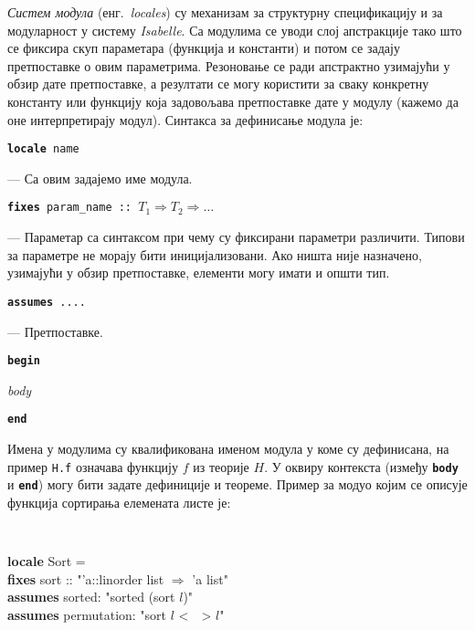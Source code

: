 {\em Систем модула} (енг.~\emph{locales}) \cite{locales} су механизам
за структурну спе\-ци\-фи\-ка\-ци\-ју и за модуларност у систему
\emph{Isabelle}. Са модулима се уводи слој апстракције тако што се
фиксира скуп параметара (функција и константи) и потом се задају
претпоставке о овим параметрима. Ре\-зо\-но\-ва\-ње се ради
апстрактно узимајући у обзир дате претпоставке, а ре\-зу\-лта\-ти се
могу користити за сваку конкретну константу или функцију која
задовољава претпоставке дате у мо\-ду\-лу (кажемо да оне
интерпретирају модул). Синтакса за дефинисање модула је:

\smallskip

{\tt \textbf{locale} name}

--- Са овим задајемо име модула. 

\vspace{0.15cm}

\hspace{0.5cm} {\tt \textbf{fixes} param\_name :: $T_1 \Longrightarrow T_2 \Longrightarrow \ldots$}

\hspace{0.5cm} --- Параметар са синтаксом при чему су фиксирани
параметри ра\-зли\-чи\-ти. Типови за параметре не морају бити
иницијализовани. Ако ништа није на\-зна\-че\-но, узимајући у обзир
претпоставке, елементи могу имати и општи тип.

\vspace{0.15cm}

\hspace{0.5cm} {\tt \textbf{assumes} ....}

\hspace{0.5cm} --- Претпоставке.

\smallskip

{\tt \textbf{begin} }

\hspace{0.5cm} {\em body} 
 
{\tt \textbf{end}}

\smallskip

Имена у модулима су квалификована именом модула у коме су дефинисана,
на пример {\tt H.f} означава функцију $f$ из теорије $H$. У оквиру
контекста (између {\tt \textbf{body}} и {\tt \textbf{end}}) могу бити
задате дефиниције и теореме. Пример за модуо којим се описује функција
сортирања елемената листе је:

\smallskip
{}
\begin{small}
{\tt 
\begin{tabbing}
\textbf{lo}\=\textbf{cale} Sort = \\
  \> \textbf{fixes} sort :: "'a::linorder list $\Rightarrow$ 'a list" \\
  \> \textbf{assumes} sorted: "sorted (sort $l$)" \\
  \> \textbf{assumes} permutation: "sort $l$ <~~> $l$"
\end{tabbing}
}
\end{small}

